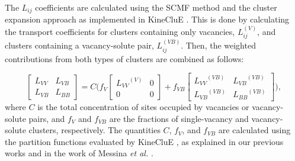 \documentclass[preprint,12pt]{elsarticle}
\begin{document}
\noindent The $L_{ij}$ coefficients are calculated using the SCMF method \cite{nastar_self-consistent_2000, nastar_mean_2005} and the cluster expansion approach as implemented in KineCluE \cite{schuler_kineclue_2020}. This is done by calculating the transport coefficients for clusters containing only vacancies, $L_{ij}^{(V)}$, and clusters containing a vacancy-solute pair, $L_{ij}^{(VB)}$. Then, the weighted contributions from both types of clusters are combined as follows:

\begin{equation}
\label{eq_onsager_matrix}
\begin{bmatrix}
L_{VV} & L_{VB} \\
L_{VB} & L_{BB}
\end{bmatrix}
=
C \Biggl(
f_V 
\begin{bmatrix}
{L_{VV}}^{(V)} & 0 \\
0 & 0 
\end{bmatrix}
+ f_{VB}
\begin{bmatrix}
{L_{VV}}^{(VB)} & {L_{VB}}^{(VB)} \\
{L_{VB}}^{(VB)} & {L_{BB}}^{(VB)}
\end{bmatrix}
\Biggr),
\end{equation}
where $C$ is the total concentration of sites occupied by vacancies or vacancy-solute pairs, and $f_V$ and $f_{VB}$ are the fractions of single-vacancy and vacancy-solute clusters, respectively. The quantities $C$, $f_V$, and $f_{VB}$ are calculated using the partition functions evaluated by KineCluE \cite{schuler_kineclue_2020}, as explained in our previous works \cite{shousha2024first, shousha_vacancy-mediated_2024} and in the work of Messina \textit{et al.} \cite{messina_solute_2020}.
\end{document}
